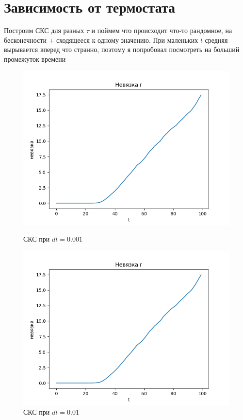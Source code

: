 \documentclass[a4paper]{article}
\begin{document}
\section{Зависимость от термостата} %
\label{sec:зависимость_от_термостата}
Построим СКС для разных $\tau$ и поймем что происходит что-то рандомное, на бесконечности $\pm$ сходящееся к одному значению. При маленьких $t$ средняя вырывается вперед что странно, поэтому я попробовал посмотреть на больший промежуток времени 
\begin{figure}[H]
\begin{center}
\begin{minipage}[h]{0.45\linewidth}
\includegraphics[width=1.1\linewidth]{rdiv.png}
\caption{СКС при $dt = 0.001$} %
\label{ris:experimoriginal} %
\end{minipage}
\hfill
\begin{minipage}[h]{0.45\linewidth}
\begin{center}
\includegraphics[width=1.1\textwidth]{rdiv.png}
\caption{СКС при $dt = 0.01$}
\end{center}
\end{minipage}
\end{center}
\end{figure}
\end{document}
